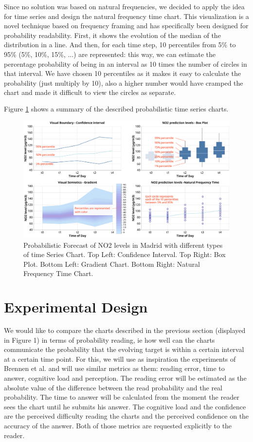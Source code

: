 \documentclass[a4paper,3p,sort&compress]{elsarticle}
\begin{document}
Since no solution was based on natural frequencies, we decided to apply the idea for time series and design the natural frequency time chart.
This visualization is a novel technique based on frequency framing and has 
specifically been designed for probability readability. First, 
it shows the evolution of the median of the distribution in a line. And then, for each time 
step, 10 percentiles from 5\% to 95\% (5\%, 10\%, 15\%, ...) are represented: this way, we can estimate the percentage 
probability of being in an interval as 10 times the number of circles in that interval. 
We have chosen 10 percentiles as it makes it easy to calculate the probability (just multiply by 10), also a higher number
would have cramped the chart and made it difficult to view the circles as separate. 

Figure \ref{figure:charts} shows a summary of the described probabilistic time series charts.

\begin{figure}
  \centering
  \includegraphics[width=.9\textwidth]{charts_vector} 
  \caption{\label{figure:charts} Probabilistic Forecast of NO2 levels in Madrid with different types of time Series Chart. 
  Top Left: Confidence Interval. Top Right: Box Plot. 
  Bottom Left: Gradient Chart. Bottom Right: Natural Frequency Time Chart. }
\end{figure} 

\section{Experimental Design}
\label{sec:exp_design}

We would like to compare the charts described in the previous section (displayed in Figure 1) 
in terms of probability 
reading, ie how well 
can the charts communicate the probability that the evolving target is within a certain interval 
at a certain time point.
 For this, we will use as inspiration the experiments of Brennen et al. \cite{brennen_instrument_2018}
and will use similar metrics 
as them: reading error, time to answer, cognitive load and perception. The reading error will be estimated as the 
absolute value of the difference between the read probability and the real probability. The time to answer 
will be calculated from the moment the reader sees the chart until he submits his answer. The cognitive 
load and the confidence are the perceived difficulty reading the charts and the perceived confidence on 
the accuracy of 
the answer. Both of those metrics are requested explicitly to the reader.
\end{document}
